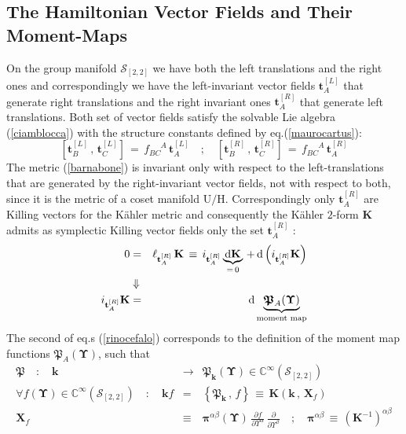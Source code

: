 \documentclass[10pt,a4paper]{article}
\begin{document}
\subsection{The Hamiltonian Vector Fields and Their Moment-Maps}
On the group manifold $\mathcal{S}_{[2,2]}$ we have both the left translations and the right ones and correspondingly we have the left-invariant vector fields $\mathbf{t}_A^{[L]}$ that generate right translations and the right invariant ones $\mathbf{t}_A^{[R]}$
that generate left translations. Both set of vector fields satisfy the solvable Lie algebra (\ref{ciamblocca}) with the structure constants defined by eq.(\ref{maurocartus}):
\begin{equation}\label{comancho}
  \left[\mathbf{t}_B^{[L]}\, , \, \mathbf{t}_C^{[L]}\right]\, = \, f_{BC}^{\phantom{BC}A} \, \mathbf{t}_A^{[L]} \quad ; \quad
  \left[\mathbf{t}_B^{[R]}\, , \, \mathbf{t}_C^{[R]}\right]\, = \, f_{BC}^{\phantom{BC}A} \, \mathbf{t}_A^{[R]}
\end{equation}
The metric (\ref{barnabone}) is invariant only with respect to the left-translations that are generated by the right-invariant vector fields, not with respect to both, since it is the metric of a coset manifold $\mathrm{U/H}$. Correspondingly only $\mathbf{t}_A^{[R]}$ are  Killing vectors for the K\"ahler metric and consequently the K\"ahler $2$-form $\mathbf{K}$ admits as symplectic Killing vector fields only the set  $\mathbf{t}_A^{[R]}$ :
\begin{eqnarray}\label{rinocefalo}
 0& = &  \ell_{\mathbf{t}_A^{[R]}}\, \mathbf{K} \, \equiv\,  i_{\mathbf{t}_A^{[R]}} \underbrace{\mathrm{d}\mathbf{K}}_{= \, 0} \, + \, \mathrm{d} \left(i_{\mathbf{t}_A^{[R]}} \mathbf{K} \right) \nonumber \\
 \null &\Downarrow& \nonumber\\
 i_{\mathbf{t}_A^{[R]}} \mathbf{K}  & = & \mathrm{d}\underbrace{\boldsymbol{\mathfrak{P}}_A(\boldsymbol{\Upsilon})}_{\text{moment map}}
\end{eqnarray}
The second of eq.s (\ref{rinocefalo}) corresponds to the definition of the moment map functions $\boldsymbol{\mathfrak{P}}_A(\boldsymbol{\Upsilon})$, such that
\begin{eqnarray}\label{momentimappo2}
  \boldsymbol{\mathfrak{P}} \quad : \quad \mathbf{k} & \longrightarrow & \boldsymbol{\mathfrak{P}}_\mathbf{k}\left(\boldsymbol{\Upsilon}\right) \in \mathbb{C}^{\infty} \left(\mathcal{S}_{[2,2]}\right)\nonumber\\
 \forall f(\boldsymbol{\Upsilon})\in \mathbb{C}^{\infty}\left(\mathcal{S}_{[2,2]}\right) \quad : \quad
\mathbf{k} f &= & \left\{\boldsymbol{\mathfrak{P}}_\mathbf{k}\, , \, f\right\} \, \equiv \, \mathbf{K} \left(\mathbf{k}\, , \, \mathbf{X}_f \right) \nonumber\\
\mathbf{X}_f & \equiv & \boldsymbol{\pi}^{\alpha\beta}(\boldsymbol{\Upsilon})\, \frac{\partial f}{\partial \Upsilon^\alpha}\, \frac{\partial}{\partial \Upsilon^\beta} \quad ; \quad \boldsymbol{\pi}^{\alpha\beta} \, \equiv \, \left(\mathbf{K}^{-1}\right)^{\alpha\beta}
\end{eqnarray}
\end{document}
